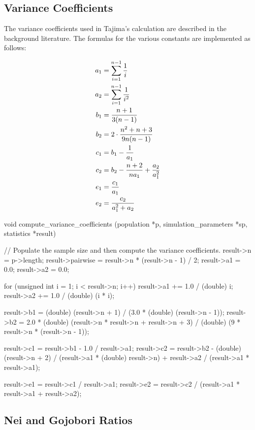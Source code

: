 \documentclass{article}
\begin{document}
    \subsection{Variance Coefficients}
      \label{sec:variance-coefficients}

      The variance coefficients used in Tajima's \D{} calculation are described
      in the background literature. The formulas for the various constants are
      implemented as follows:

      \begin{align*}
	a_1 & = \sum_{i=1}^{n-1} {1 \over i} \\ %
	a_2 & = \sum_{i=1}^{n-1} {1 \over i^2} \\ %
	b_1 & = {n + 1 \over 3(n - 1)} \\ %
	b_2 & = 2 \cdot {n^2 + n + 3 \over 9n(n - 1)} \\ %
	c_1 & = b_1 - {1 \over a_1} \\ %
	c_2 & = b_2 - {n + 2 \over na_1} + {a_2 \over a_1^2} \\ %
	e_1 & = {c_1 \over a_1} \\ %
	e_2 & = {c_2 \over a_1^2 + a_2}
      \end{align*}

\begin{ccode}
void compute_variance_coefficients (population *p, simulation_parameters *sp, statistics *result) {
  // Populate the sample size and then compute the variance coefficients.
  result->n 		= p->length;
  result->pairwise	= result->n * (result->n - 1) / 2;
  result->a1		= 0.0;
  result->a2		= 0.0;

  for (unsigned int i = 1; i < result->n; i++) {
    result->a1 += 1.0 / (double) i;
    result->a2 += 1.0 / (double) (i * i);
  }

  result->b1 = (double) (result->n + 1) / (3.0 * (double) (result->n - 1));
  result->b2 = 2.0 * (double) (result->n * result->n + result->n + 3) /
		     (double) (9 * result->n * (result->n - 1));

  result->c1 = result->b1 - 1.0 / result->a1;
  result->c2 = result->b2 -
	       (double) (result->n + 2) / (result->a1 * (double) result->n) +
	       result->a2 / (result->a1 * result->a1);

  result->e1 = result->c1 / result->a1;
  result->e2 = result->c2 / (result->a1 * result->a1 + result->a2);
}
\end{ccode}

    \subsection{Nei and Gojobori Ratios}
      \label{sec:nei-gojobori}
\end{document}
